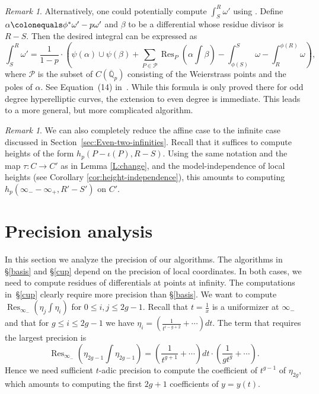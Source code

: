 \documentclass[11pt, a4paper]{amsart}
\newcommand{\Q}{\mathbb{Q}}
\newcommand{\Res}{\operatorname{Res}}
\theoremstyle{remark}
\newtheorem{remark}[theorem]{Remark}
\numberwithin{equation}{section}
\newcommand{\sg}{{}}
\newcommand{\sm}{{}}
\begin{document}
\begin{remark}\label{R:BB-nonholo-integral}
Alternatively, one could potentially compute $\int^R_S\omega'$ using 
\cite[Algorithm 4.8]{BBHeights}. Define $\alpha\colonequals
  \phi^*\omega'-p\omega'$ and $\beta$ to be a differential whose residue
  divisor is $R-S$. Then the desired integral can be expressed as 
  \begin{equation}\label{E:4.8}
\int_S^R\omega'=\dfrac{1}{1-p}\cdot \left(\psi(\alpha)\cup\psi(\beta)+\sum_{P\in\mathcal{P}}\Res_P\left(\alpha\int\beta\right)-\int_{\phi(S)}^S\omega-\int_{R}^{\phi(R)}\omega\right),
  \end{equation}
where $\mathcal{P}$ is the subset of $C(\overline{\Q}_p)$ consisting of the
Weierstrass points and the
poles of $\alpha$. See Equation~(14) in~\cite{BBHeights}.
While this formula is only proved there for odd degree hyperelliptic curves, the extension
to even degree is immediate. This leads to a more general, but more complicated algorithm.
\end{remark}


\begin{remark}\label{R:aff_inf}
We can also completely reduce the affine case
  to the infinite case discussed in Section~\ref{sec:Even-two-infinities}. 
  Recall that it suffices to compute heights of the form $h_p(P-\iota(P), R-S)$.
  \sg{Using the same notation and the map $\tau\colon C\rightarrow C'$ as in Lemma
  \ref{L:change}, and the model-independence of local heights (see Corollary
  \ref{cor:height-independence}), this amounts to computing $h_p(\infty_- - \infty_+, R'-S')$
  on $C'$.}
\end{remark}



\section{Precision analysis}\label{sec:prec-p-adic-heights}
\sm{
  In this section we analyze the precision of our algorithms.}
  The algorithms in \S\ref{basis} and \S\ref{cup}  depend on the precision of local
coordinates. In both cases, we need to compute residues of differentials at
points at infinity. The computations in~\S\ref{cup} clearly require more precision than
\S\ref{basis}. We want to compute
$\Res_{\infty_-}\left(\eta_j\int\eta_i\right)$ for $0\leq i,j\leq 2g-1$.
Recall that $t=\frac{1}{x}$ is a uniformizer at $\infty_-$ and that for $g\leq i\leq 2g-1$ we have
$\eta_i=\left( \frac{1}{t^{i-g+2}}+\cdots\right)dt$. The term that requires the largest precision is 
\[
\Res_{\infty_-}\left(\eta_{2g-1}\int\eta_{2g-1}\right)=\left( \frac{1}{t^{g+1}}+\cdots\right)dt\cdot \left( \frac{1}{gt^{g}}+\cdots\right).
\]
Hence we need sufficient $t$-adic precision to compute the coefficient of
$t^{g-1}$ of $\eta_{2g}$, which amounts to computing the first $2g+1$ coefficients of $y=y(t)$. 
\end{document}
